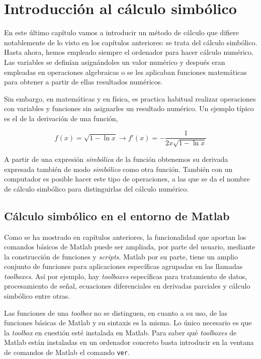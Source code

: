 \chapter{Introducción al cálculo simbólico}
En este último capítulo vamos a introducir un método de cálculo que difiere notablemente de lo visto  en los capítulos anteriores: se trata del cálculo simbólico. Hasta ahora, hemos empleado siempre el ordenador para hacer cálculo numérico. Las variables se definían asignándoles un valor numérico y después eran empleadas en operaciones algebraicas o se les aplicaban funciones matemáticas para obtener a partir de ellas resultados numéricos.

Sin embargo, en matemáticas y en física, es practica habitual realizar operaciones con variables y funciones sin asignarles un resultado numérico. Un ejemplo típico es el de la derivación de una función,

\begin{equation*}
f(x) = \sqrt{1-\ln x} \rightarrow f'(x) =-\frac{1}{2x\sqrt{1 - \ln x}} 
\end{equation*}  

A partir de una expresión \emph{simbólica} de la función obtenemos su derivada expresada también de modo \emph{simbólico} como otra función. También con un computador es posible hacer este tipo de operaciones, a las que se da el nombre de cálculo simbólico para distinguirlas del cálculo numérico.  


\section{Cálculo simbólico en el entorno de Matlab}
Como se ha mostrado en capítulos anteriores, la funcionalidad que aportan los comandos básicos de Matlab puede ser ampliada, por parte del usuario, mediante la construcción de funciones y \emph{scripts}. Matlab por su parte, tiene un amplio conjunto de funciones para aplicaciones específicas agrupadas en las llamadas \emph{toolboxes}. Así por ejemplo, hay \emph{toolboxes} específicas para tratamiento de datos, procesamiento de señal, ecuaciones diferenciales en derivadas parciales y cálculo simbólico entre otras. 

Las funciones de una \emph{toolbox} no se distinguen, en cuanto a su uso, de las funciones básicas de Matlab y su sintaxis es la misma. Lo único necesario es que la \emph{toolbox} en cuestión esté instalada en Matlab. Para saber qué \emph{toolboxes} de Matlab están instaladas en un ordenador concreto basta introducir en la ventana de comandos de Matlab el comando \texttt{ver}. 

